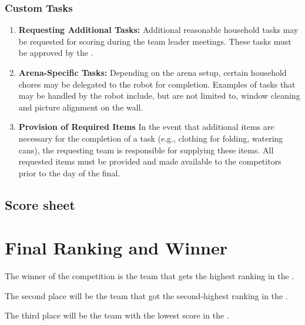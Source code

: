 \subsubsection{Custom Tasks}
\begin{enumerate}[nosep]
\item \textbf{Requesting Additional Tasks:} Additional reasonable household tasks may be requested for scoring during the team leader meetings. These tasks must be approved by the \TC{}.

\item \textbf{Arena-Specific Tasks:} Depending on the arena setup, certain household chores may be delegated to the robot for completion. Examples of tasks that may be handled by the robot include, but are not limited to, window cleaning and picture alignment on the wall.

\item \textbf{Provision of Required Items} In the event that additional items are necessary for the completion of a task (e.g., clothing for folding, watering cans), the requesting team is responsible for supplying these items. All requested items must be provided and made available to the competitors prior to the day of the final.
\end{enumerate}

\subsection*{Score sheet}


\section{Final Ranking and Winner}

The winner of the competition is the team that gets the highest ranking in the .

The second place will be the team that got the second-highest ranking in the .

The third place will be the team with the lowest score in the .


